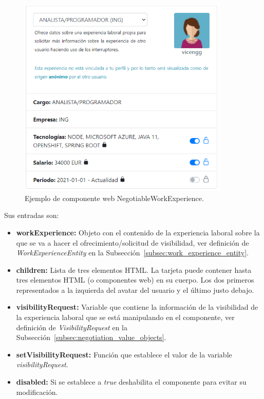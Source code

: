 \documentclass[a4paper, 12pt]{book}
\begin{document}
\begin{figure}
  \centering
  \includegraphics[width=10cm, keepaspectratio]{img/NegotiableWorkExperience.PNG}
  \caption{Ejemplo de componente web NegotiableWorkExperience.}\label{fig:component_negotiable_work_experience}
\end{figure}

Sus entradas son:

		\begin{itemize}
		\item \textbf{workExperience:} Objeto con el contenido de la experiencia laboral sobre la que se va a hacer el ofrecimiento/solicitud de visibilidad, ver definición de \emph{WorkExperienceEntity} en la Subsección~\ref{subsec:work_experience_entity}.
		\item \textbf{children:} Lista de tres elementos HTML. La tarjeta puede contener hasta tres elementos HTML (o componentes web) en su cuerpo. Los dos primeros representados a la izquierda del avatar del usuario y el último justo debajo.
		\item \textbf{visibilityRequest:} Variable que contiene la información de la visibilidad de la experiencia laboral que se está manipulando en el componente, ver definición de \emph{VisibilityRequest} en la Subsección~\ref{subsec:negotiation_value_objects}.
		\item \textbf{setVisibilityRequest:} Función que establece el valor de la variable \emph{visibilityRequest}.
		\item \textbf{disabled:} Si se establece a \emph{true} deshabilita el componente para evitar su modificación.
		\end{itemize}
\end{document}
